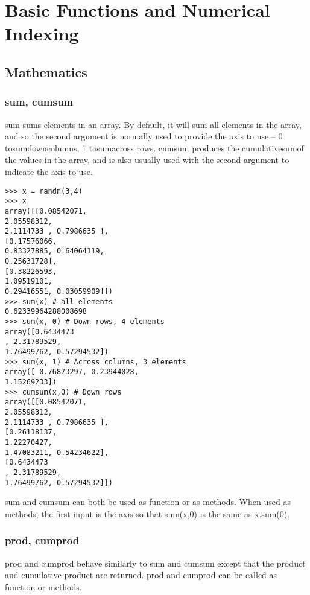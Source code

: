 \documentclass[KSmain.tex]{subfiles}
\begin{document}
 

\section{Basic Functions and Numerical Indexing}
\subsection{Mathematics}
\subsubsection*{sum, cumsum}
sum sums elements in an array. By default, it will sum all elements in the array, and so the second argument
is normally used to provide the axis to use – 0 tosumdowncolumns, 1 tosumacross rows. cumsum produces
the cumulativesumof the values in the array, and is also usually used with the second argument to indicate
the axis to use.
\begin{framed}
\begin{verbatim}
>>> x = randn(3,4)
>>> x
array([[0.08542071,
2.05598312,
2.1114733 , 0.7986635 ],
[0.17576066,
0.83327885, 0.64064119,
0.25631728],
[0.38226593,
1.09519101,
0.29416551, 0.03059909]])
>>> sum(x) # all elements
0.62339964288008698
>>> sum(x, 0) # Down rows, 4 elements
array([0.6434473
, 2.31789529,
1.76499762, 0.57294532])
>>> sum(x, 1) # Across columns, 3 elements
array([ 0.76873297, 0.23944028,
1.15269233])
>>> cumsum(x,0) # Down rows
array([[0.08542071,
2.05598312,
2.1114733 , 0.7986635 ],
[0.26118137,
1.22270427,
1.47083211, 0.54234622],
[0.6434473
, 2.31789529,
1.76499762, 0.57294532]])
\end{verbatim}
\end{framed}
sum and cumsum can both be used as function or as methods. When used as methods, the first input is the
axis so that sum(x,0) is the same as x.sum(0).
\subsubsection*{prod, cumprod}
prod and cumprod behave similarly to sum and cumsum except that the product and cumulative product are
returned. prod and cumprod can be called as function or methods.
\end{document}
